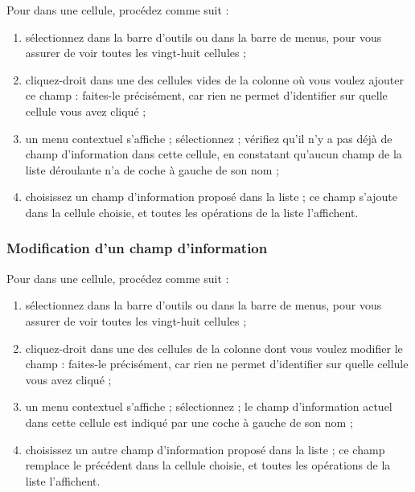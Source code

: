 Pour  dans une cellule, procédez comme suit :

\begin{enumerate}
	 \item sélectionnez  dans la barre d'outils ou  dans la barre de menus, pour vous assurer de voir toutes les vingt-huit cellules ;
	 \item cliquez-droit dans une des cellules vides de la colonne où vous voulez ajouter ce champ : faites-le précisément, car rien ne permet d'identifier sur quelle cellule vous avez cliqué ;
	 \item  un menu contextuel s'affiche ; sélectionnez  ; vérifiez qu'il n'y a pas déjà de champ d'information dans cette cellule, en constatant qu'aucun champ de la liste déroulante n'a de coche à gauche de son nom ;
	 \item choisissez un champ d'information proposé dans la liste ; ce champ s'ajoute dans la cellule choisie, et toutes les opérations de la liste l'affichent.
\end{enumerate}


\subsubsection{Modification d'un champ d'information\label{transactions-list-fields-modify}}

Pour  dans une cellule, procédez comme suit :

\begin{enumerate}
	 \item sélectionnez  dans la barre d'outils ou  dans la barre de menus, pour vous assurer de voir toutes les vingt-huit cellules ;
	 \item cliquez-droit dans une des cellules de la colonne dont vous voulez modifier le champ : faites-le précisément, car rien ne permet d'identifier sur quelle cellule vous avez cliqué ;
	 \item  un menu contextuel s'affiche ; sélectionnez  ; le champ d'information actuel dans cette cellule est indiqué par une coche à gauche de son nom ;
	 \item choisissez un autre champ d'information proposé dans la liste ; ce champ remplace le précédent dans la cellule choisie, et toutes les opérations de la liste l'affichent.
\end{enumerate}


